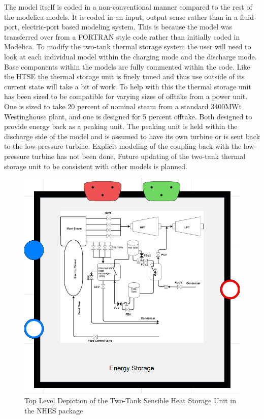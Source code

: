 The model itself is coded in a non-conventional manner compared to the rest of the modelica models. It is coded in an input, output sense rather than in a fluid-port, electric-port based modeling system. This is because the model was transferred over from a FORTRAN style code rather than initially coded in Modelica. To modify the two-tank thermal storage system the user will need to look at each individual model within the charging mode and the discharge mode. Base components within the models are fully commented within the code. Like the HTSE the thermal storage unit is finely tuned and thus use outside of its current state will take a bit of work. To help with this the thermal storage unit has been sized to be compatible for varying sizes of offtake from a power unit. One is sized to take 20 percent of nominal steam from a standard 3400MWt Westinghouse plant, and one is designed for 5 percent offtake. Both designed to provide energy back as a peaking unit. The peaking unit is held within the discharge side of the model and is assumed to have its own turbine or is sent back to the low-pressure turbine. Explicit modeling of the coupling back with the low-pressure turbine has not been done. Future updating of the two-tank thermal storage unit to be consistent with other models is planned.

 
\begin{figure}[hbtp]
\centering
\includegraphics[scale=0.3]{pics/Sensible_Heat_System.png}
\caption{Top Level Depiction of the Two-Tank Sensible Heat Storage Unit in the NHES package}
\label{Top View Two Tank Sensible Storage}
\end{figure}

